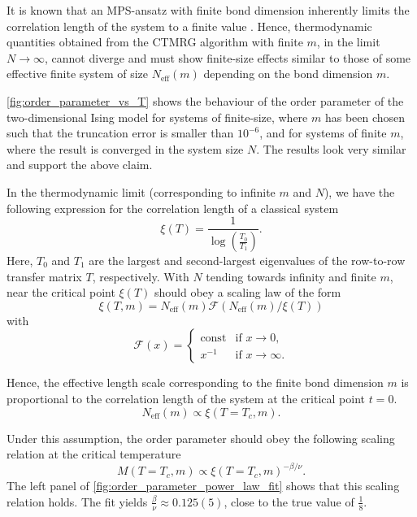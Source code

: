 It is known that an MPS-ansatz with finite bond dimension inherently limits the
correlation length of the system to a finite value \cite{wolf2006quantum}. Hence,
thermodynamic quantities obtained from the CTMRG algorithm with finite $m$, in the limit
$N \to \infty$, cannot diverge and must show finite-size effects similar to those of some
effective finite system of size $N_{\text{eff}}(m)$ depending on the bond dimension $m$.

\autoref{fig:order_parameter_vs_T} shows the behaviour of the order parameter of the
two-dimensional Ising model for systems of finite-size, where $m$ has been chosen such
that the truncation error is smaller than $10^{-6}$, and for systems of finite $m$, where
the result is converged in the system size $N$. The results look very similar and support
the above claim.


In the thermodynamic limit (corresponding to infinite $m$ and $N$), we have the following
expression for the correlation length of a classical system
\cite{baxter1982exactly_correlation_length}
\begin{equation}
  \xi(T) = \frac{1}{\log\left(\frac{T_0}{T_1}\right)}.
\end{equation}
Here, $T_0$ and $T_1$ are the largest and second-largest eigenvalues of the row-to-row
transfer matrix $T$, respectively. With $N$ tending towards infinity and finite $m$, near
the critical point $\xi(T)$ should obey a scaling law of the form
\begin{equation}
  \xi(T, m) = N_{\text{eff}}(m) \mathcal{F}(N_{\text{eff}}(m) / \xi(T))
\end{equation}
with
\begin{equation}
  \mathcal{F}(x) = \begin{cases}
      \text{const} & \text{if } x \to 0, \\
      x^{-1} & \text{if } x \to \infty.
    \end{cases}
\end{equation}

Hence, the effective length scale corresponding to the finite bond dimension $m$ is
proportional to the correlation length of the system at the critical point $t = 0$.
\begin{equation}
  N_{\text{eff}}(m) \propto \xi(T = T_c, m).
\end{equation}

Under this assumption, the order parameter should obey the following scaling relation at
the critical temperature
\begin{equation}\label{eq:order_param_scaling_relation_finite_m}
  M(T = T_c, m) \propto \xi(T = T_c, m)^{-\beta/\nu}.
\end{equation}
The left panel of \autoref{fig:order_parameter_power_law_fit} shows that this scaling
relation holds. The fit yields $\frac{\beta}{\nu} \approx 0.125(5)$, close to the true
value of $\frac{1}{8}$.

